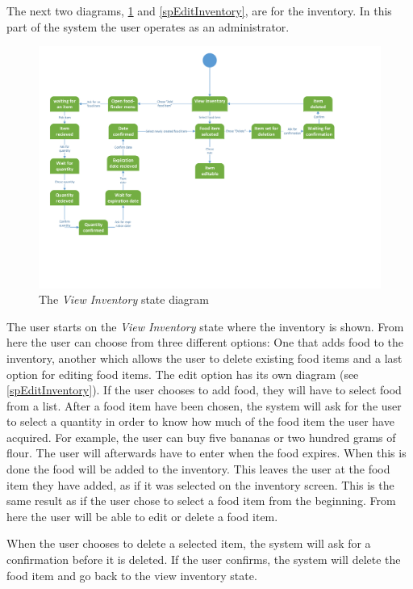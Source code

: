 The next two diagrams, \cref{Inventory_Figure} and \cref{spEditInventory}, are for the inventory. In this part of the system the user operates as an administrator.

\begin{figure}[H]
	\centering
	\includegraphics[width=1.0\textwidth, trim= 0 4cm 3cm 0]{ApplicationDomain/spViewInventory.pdf} 
	\caption{The \textit{View Inventory} state diagram}
	\label{Inventory_Figure}
\end{figure}
The user starts on the \textit{View Inventory} state where the inventory is shown. From here the user can choose from three different options: One that adds food to the inventory, another which allows the user to delete existing food items and a last option for editing food items. The edit option has its own diagram (see \cref{spEditInventory}). If the user chooses to add food, they will have to select food from a list. After a food item have been chosen, the system will ask for the user to select a quantity in order to know how much of the food item the user have acquired. For example, the user can buy five bananas or two hundred grams of flour. The user will afterwards have to enter when the food expires. When this is done the food will be added to the inventory. This leaves the user at the food item they have added, as if it was selected on the inventory screen. This is the same result as if the user chose to select a food item from the beginning. From here the user will be able to edit or delete a food item. \label{InvDesc}

When the user chooses to delete a selected item, the system will ask for a confirmation before it is deleted. If the user confirms, the system will delete the food item and go back to the view inventory state.


